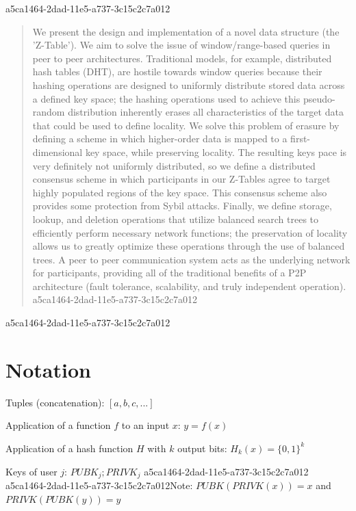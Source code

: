 \documentclass[12pt]{article}
\begin{document}
\maketitle
a5ca1464-2dad-11e5-a737-3c15c2c7a012
\begin{abstract}
We present the design and implementation of a novel data structure (the 'Z-Table'). We aim to solve the issue of window/range-based queries in peer to peer architectures. Traditional models, for example,  distributed hash tables (DHT), are hostile towards window queries because their hashing operations are designed to uniformly distribute stored data across a defined key space; the hashing operations used to achieve this pseudo-random distribution inherently erases all characteristics of the target data that could be used to define locality. We solve this problem of erasure by defining a scheme in which higher-order data is mapped to a first-dimensional key space, while preserving locality. The resulting keys pace is very definitely not uniformly distributed, so we define a distributed consensus scheme in which participants in our Z-Tables agree to target highly populated regions of the key space. This consensus scheme also provides some protection from Sybil attacks. Finally, we define storage, lookup, and deletion operations that utilize balanced search trees to efficiently perform necessary network functions; the preservation of locality allows us to greatly optimize these operations through the use of balanced trees. A peer to peer communication system acts as the underlying network for participants, providing all of the traditional benefits of a P2P architecture (fault tolerance, scalability, and truly independent operation).
a5ca1464-2dad-11e5-a737-3c15c2c7a012\end{abstract}

a5ca1464-2dad-11e5-a737-3c15c2c7a012\section{Notation}

Tuples (concatenation): $[a,b,c,...]$

Application of a function $f$ to an input $x$: $y=f(x)$

Application of a hash function $H$ with $k$ output bits: $H_{k}(x) = \{0,1\}^k$

Keys of user $j$: $ PUBK_j; PRIVK_j $
a5ca1464-2dad-11e5-a737-3c15c2c7a012
a5ca1464-2dad-11e5-a737-3c15c2c7a012Note: $PUBK(PRIVK(x)) = x$ and $PRIVK(PUBK(y)) = y$~
\end{document}
